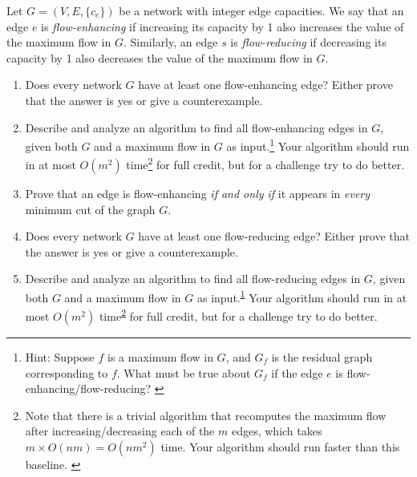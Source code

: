 \documentclass[11pt]{article}
\theoremstyle{definition}
\begin{document}
\begin{enumerate}[leftmargin=0pt]
\problemitem Let $G = (V,E,\{c_e\})$ be a network with integer edge capacities.  We say that an edge $e$ is \emph{flow-enhancing} if increasing
its capacity by 1 also increases the value of the maximum flow in $G$. Similarly, an edge $s$ is
\emph{flow-reducing} if decreasing its capacity by 1 also decreases the value of the maximum flow
in $G$.
\begin{enumerate}[leftmargin=0pt, itemsep=3ex]
\item Does every network $G$ have at least one flow-enhancing edge?  Either prove that the answer is yes or give  a counterexample.

\item Describe and analyze an algorithm to find all flow-enhancing edges in $G$, given both $G$ and a
maximum flow in $G$ as input.\footnote{Hint: Suppose $f$ is a maximum flow in $G$, and $G_{f}$ is the residual graph corresponding to $f$.  What must be true about $G_f$ if the edge $e$ is flow-enhancing/flow-reducing? \label{footnote1}}  Your algorithm should run in at most $O(m^2)$ time\footnote{Note that there is a trivial algorithm that recomputes the maximum flow after increasing/decreasing each of the $m$ edges, which takes $m \times O(nm) = O(nm^2)$ time.  Your algorithm should run faster than this baseline. \label{footnote2}} for full credit, but for a challenge try to do better.

\item Prove that an edge is flow-enhancing \emph{if and only if} it appears in \emph{every} minimum cut of the graph $G$.

\item Does every network $G$ have at least one flow-reducing edge?  Either prove that the answer is yes or give  a counterexample.

\item Describe and analyze an algorithm to find all flow-reducing edges in $G$, given both $G$ and a
maximum flow in $G$ as input.\textsuperscript{\ref{footnote1}}  Your algorithm should run in at most $O(m^2)$ time\textsuperscript{\ref{footnote2}} for full credit, but for a challenge try to do better.
\end{enumerate}


\end{enumerate}
\end{document}
